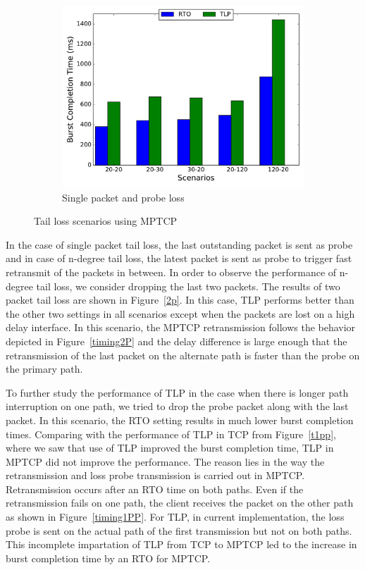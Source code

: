 \documentclass[10pt,conference]{IEEEtran}
\begin{document}
\begin{figure}[!tbp]
\begin{subfigure}[b]{0.32\textwidth}
\includegraphics[angle=0, width=\textwidth, natwidth=578.16,natheight=433.62]{plots/1PP.pdf}
\caption{Single packet and probe loss}\label{1pp}
 \end{subfigure}
 \caption{Tail loss scenarios using MPTCP}
\end{figure}





In the case of single packet tail loss, the last outstanding packet is sent as probe and in case of n-degree tail loss,
the latest packet is sent as probe to trigger fast retransmit of the packets in between. In order to observe
the performance of n-degree tail loss, we consider dropping the last two packets. 
The results of two packet tail loss are shown in Figure~\ref{2p}. In this case, TLP performs better than the other 
two settings in all scenarios except when the packets are lost on a high delay interface. In this scenario, the MPTCP retransmission follows the behavior depicted in Figure~\ref{timing2P} and the delay difference is large enough that the retransmission of the last packet on the alternate path is faster than the probe on the primary path. 


To further study the performance of TLP in the case when there is longer path interruption on one path, we tried to drop the probe packet along with the last packet. In this scenario, the RTO
setting results in much lower burst completion times. Comparing with the performance of TLP in TCP from Figure~\ref{t1pp}, where we saw that use of TLP improved the burst completion time, TLP in MPTCP did not improve the performance. The reason lies in the way the retransmission and loss probe transmission is carried out in MPTCP. Retransmission occurs after an RTO time on both paths.
Even if the retransmission fails on one path, the client receives the packet on the other path as shown in Figure~\ref{timing1PP}. For TLP, in
current implementation, the loss probe is sent on the actual path of the first transmission but not on both paths. This incomplete impartation of
TLP from TCP to MPTCP led to the increase in burst completion time by an RTO for MPTCP. 
\end{document}
